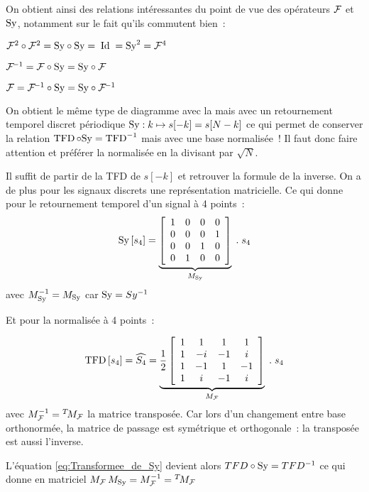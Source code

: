 On obtient ainsi des relations intéressantes du point de vue des
opérateurs $\mathcal{F}$ et $\mathrm{Sy}$, notamment sur le fait qu'ils commutent bien~:
\begin{description}
\item $\mathcal{F}^2\circ\mathcal{F}^2 = \mathrm{Sy}\circ\mathrm{Sy} =\; \mathrm{Id} \;  = \mathrm{Sy}^2 = \mathcal{F}^4$
\item $\mathcal{F}^{\!-1} = \mathcal{F}\circ\mathrm{Sy} = \mathrm{Sy}\circ\mathcal{F}$
\item $\mathcal{F} = \mathcal{F}^{\!-1}\circ\mathrm{Sy} = \mathrm{Sy}\circ\mathcal{F}^{\!-1}$
\end{description}
\begin{remarque} 

  On obtient le même type de diagramme avec la \TFD{} mais avec un
  retournement temporel discret périodique
  $\mathrm{Sy} : k \mapsto s[-k]= s[N-k]$ ce qui permet de conserver la
  relation $\mathop{\mathrm{TFD}}\circ\mathrm{Sy}=\mathop{\mathrm{TFD}}^{-1}$ mais avec une base normalisée~!
  Il faut donc faire attention et préférer la \TFD{} normalisée en la
  divisant par $\sqrt{N}$.

  Il suffit de partir de la TFD de $s[-k]$ et retrouver la formule de
  la \TFD{} inverse. On a de plus pour les signaux discrets une
  représentation matricielle. Ce qui donne pour le retournement
  temporel d'un signal à 4 points~:
  \begin{equation}
    \label{eq:sy_matriciel}
    \mathrm{Sy}\left[s_4\right] = \underbrace{
      \left[\begin{array}{cccc}
      1 & 0 & 0 & 0\\
      0 & 0 & 0 & 1\\
      0 & 0 & 1 & 0\\
      0 & 1 & 0 & 0
          \end{array}\right]}_{M_{\mathrm{Sy}}}\;.\;s_4
    \end{equation}
    avec $M_{\mathrm{Sy}}^{-1}=M_{\mathrm{Sy}}$ car $\mathrm{Sy}=Sy^{-1}$

  Et pour la \TFD{} normalisée à 4 points~:

  \begin{equation}
    \label{eq:tfd4_matriciel}
    \mathop{\mathrm{TFD}}\left[s_4\right] = \widehat{S_4} = \underbrace{
    \frac{1}{2}\left[\begin{array}{cccc}
      1 & 1 & 1 & 1\\
      1 & -i & -1 & i\\
      1 & -1 & 1 & -1\\
      1 & i & -1 & i
          \end{array}\right]}_{M_{\mathcal{F}}}\;.\;s_4
    \end{equation}
    avec $M_{\mathcal{F}}^{-1}={}^T\!{M_{\mathcal{F}}}$ la matrice transposée. Car lors
    d'un changement entre base orthonormée, la matrice de passage est
    symétrique et orthogonale~: la transposée est aussi l'inverse.


    L'équation \eqref{eq:Transformee_de_Sy} devient alors
    $TFD\circ\mathrm{Sy} =  TFD{}^{-1}$ ce qui donne en matriciel
    $M_{\mathcal{F}}\,M_{\mathrm{Sy}} = M_{\mathcal{F}}^{-1} = {}^T\!{M_{\mathcal{F}}} $
  \end{remarque}

